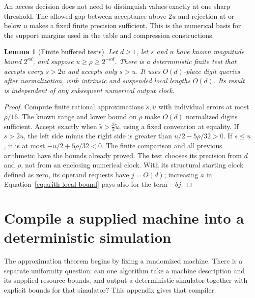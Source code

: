 \documentclass[11pt]{article}
\numberwithin{equation}{section}
\newtheorem{lemma}[theorem]{Lemma}
\theoremstyle{definition}
\theoremstyle{remark}
\begin{document}
An access decision does not need to distinguish values exactly at one sharp threshold. The allowed gap between acceptance above $2u$ and rejection at or below $u$ makes a fixed finite precision sufficient. This is the numerical basis for the support margins used in the table and compression constructions.

\begin{lemma}[Finite buffered tests]
\label{lem:arith-buffered-test}
Let $d\geq1$, let $s$ and $u$ have known magnitude bound $2^{\kappa d}$,
and suppose $u\geq\rho\geq2^{-\kappa d}$.  There is a deterministic
finite test that accepts every $s>2u$ and accepts only $s>u$.
It uses $O(d)$-place digit queries after normalization, with
intrinsic and suspended local lengths $O(d)$.  Its result is
independent of any subsequent numerical output clock.
\end{lemma}

\begin{proof}
Compute finite rational approximations $\widetilde s,\widetilde u$
with individual errors at most $\rho/16$.  The known range and
lower bound on $\rho$ make $O(d)$ normalized digits sufficient.
Accept exactly when
$\widetilde s>\tfrac32\widetilde u$, using a fixed convention
at equality.  If $s>2u$, the left side minus the right side is
greater than $u/2-5\rho/32>0$.  If $s\leq u$, it is at most
$-u/2+5\rho/32<0$.  The finite comparison and all previous
arithmetic have the bounds already proved.  The test chooses its
precision from $d$ and $\rho$, not from an enclosing numerical
clock.  With its structural starting clock defined as zero, its
operand requests have $j=O(d)$; increasing $a$ in
Equation~\eqref{eq:arith-local-bound} pays also for the term $-bj$.
\end{proof}





\section{Compile a supplied machine into a deterministic simulation}
\label{sec:compiler}

The approximation theorem begins by fixing a randomized machine. There is a separate uniformity question: can one algorithm take a machine description and its supplied resource bounds, and output a deterministic simulator together with explicit bounds for that simulator? This appendix gives that compiler.
\end{document}
